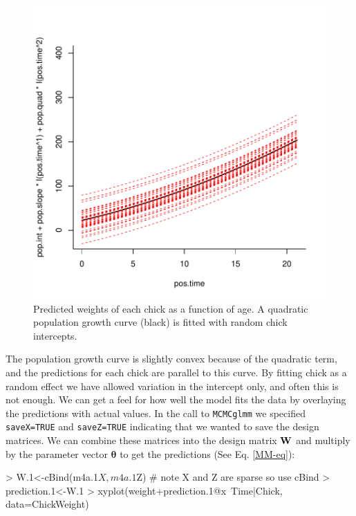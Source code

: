 \documentclass{article}
\begin{document}
\begin{figure}[!h]
\begin{center}
\includegraphics{Lecture4-011}
\end{center}
\caption{Predicted weights of each chick as a function of age. A quadratic population growth curve (black) is fitted with random chick intercepts.}
\label{CWpred.1-fig}
\end{figure}

The population growth curve is slightly convex because of the quadratic term, and the predictions for each chick are parallel to this curve. By fitting chick as a random effect we have allowed variation in the intercept only, and often this is not enough. We can get a feel for how well the model fits the data by overlaying the predictions with actual values. In the call to \texttt{MCMCglmm} we specified \texttt{saveX=TRUE} and \texttt{saveZ=TRUE} indicating that we wanted to save the design matrices. We can combine these matrices into the design matrix ${\bf W}$ and multiply by the parameter vector ${\bm \theta}$ to get the predictions (See Eq. \ref{MM-eq}):

\begin{Schunk}
\begin{Sinput}
> W.1<-cBind(m4a.1$X, m4a.1$Z)  # note X and Z are sparse so use cBind
> prediction.1<-W.1%
> xyplot(weight+prediction.1@x~Time|Chick, data=ChickWeight)
\end{Sinput}
\end{Schunk}
\end{document}
